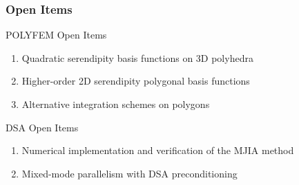 \documentclass[compress,10pt]{beamer}
\begin{document}
\begin{frame}[t]\frametitle{Open Items}
\begin{block}{POLYFEM Open Items}
\begin{enumerate}
\item Quadratic serendipity basis functions on 3D polyhedra
\item Higher-order 2D serendipity polygonal basis functions
\item Alternative integration schemes on polygons
\end{enumerate}
\end{block}
\begin{block}{DSA Open Items}
\begin{enumerate}
\item Numerical implementation and verification of the MJIA method
\item Mixed-mode parallelism with DSA preconditioning
\end{enumerate}
\end{block}
\end{frame}

\typeout{***********************************************************************************}
\end{document}
